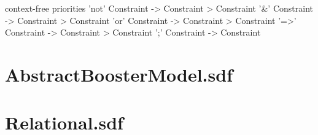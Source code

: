 \begin{code}
context-free priorities
  'not' Constraint		-> Constraint 
  > Constraint '&' Constraint 	-> Constraint 
  > Constraint 'or' Constraint 	-> Constraint
  > Constraint '=>' Constraint 	-> Constraint 
  > Constraint ';' Constraint 	-> Constraint 
\end{code}


\section{AbstractBoosterModel.sdf}
\section{Relational.sdf}
